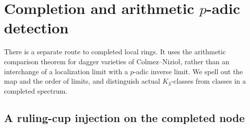 \section{Completion and arithmetic \texorpdfstring{$p$}{p}-adic detection}\label{d3:sec:completed}

There is a separate route to completed local rings. It uses the arithmetic comparison theorem for dagger varieties of Colmez--Nizio\l, rather than an interchange of a localization limit with a $p$-adic inverse limit. We spell out the map and the order of limits, and distinguish actual $K_3$-classes from classes in a completed spectrum.

\subsection{A ruling-cup injection on the completed node}


